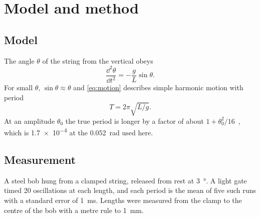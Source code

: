 \chapter{Model and method}
\label{ch:method}

\section{Model}

The angle $\theta$ of the string from the vertical obeys
\begin{equation}
  \frac{\dd^2\theta}{\dd t^2} = -\frac{g}{L} \sin\theta .
  \label{eq:motion}
\end{equation}
For small $\theta$, $\sin\theta \approx \theta$ and \cref{eq:motion} describes simple harmonic motion with period
\begin{equation}
  T = 2\pi \sqrt{L/g} .
  \label{eq:period}
\end{equation}
At an amplitude $\theta_0$ the true period is longer by a factor of about $1 + \theta_0^2/16$~\cite{nelson1986}, which is \num{1.7e-4} at the \qty{0.052}{\radian} used here.

\section{Measurement}

A steel bob hung from a clamped string, released from rest at \qty{3}{\degree}. A light gate timed 20 oscillations at each length, and each period is the mean of five such runs with a standard error of \qty{1}{\milli\second}. Lengths were measured from the clamp to the centre of the bob with a metre rule to \qty{1}{\milli\metre}.
